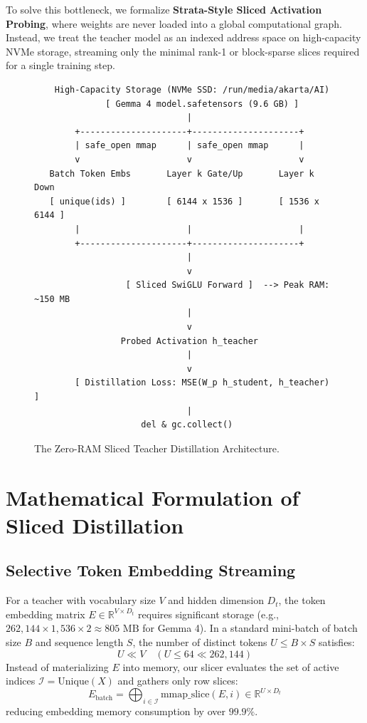 \documentclass[11pt,a4paper]{article}
\begin{document}
To solve this bottleneck, we formalize \textbf{Strata-Style Sliced Activation Probing}, where weights are never loaded into a global computational graph. Instead, we treat the teacher model as an indexed address space on high-capacity NVMe storage, streaming only the minimal rank-1 or block-sparse slices required for a single training step.

\begin{figure}[h]
\centering
\begin{verbatim}
    High-Capacity Storage (NVMe SSD: /run/media/akarta/AI)
              [ Gemma 4 model.safetensors (9.6 GB) ]
                              |
        +---------------------+---------------------+
        | safe_open mmap      | safe_open mmap      |
        v                     v                     v
   Batch Token Embs       Layer k Gate/Up       Layer k Down
   [ unique(ids) ]        [ 6144 x 1536 ]       [ 1536 x 6144 ]
        |                     |                     |
        +---------------------+---------------------+
                              |
                              v
                  [ Sliced SwiGLU Forward ]  --> Peak RAM: ~150 MB
                              |
                              v
                 Probed Activation h_teacher
                              |
                              v
        [ Distillation Loss: MSE(W_p h_student, h_teacher) ]
                              |
                     del & gc.collect()
\end{verbatim}
\caption{The Zero-RAM Sliced Teacher Distillation Architecture.}
\label{fig:zero_ram_arch}
\end{figure}

\section{Mathematical Formulation of Sliced Distillation}

\subsection{Selective Token Embedding Streaming}
For a teacher with vocabulary size $V$ and hidden dimension $D_t$, the token embedding matrix $E \in \mathbb{R}^{V \times D_t}$ requires significant storage (e.g., $262,144 \times 1,536 \times 2 \approx 805\text{ MB}$ for Gemma 4). In a standard mini-batch of batch size $B$ and sequence length $S$, the number of distinct tokens $U \le B \times S$ satisfies:
\begin{equation}
U \ll V \quad (U \le 64 \ll 262,144)
\end{equation}
Instead of materializing $E$ into memory, our slicer evaluates the set of active indices $\mathcal{I} = \text{Unique}(X)$ and gathers only row slices:
\begin{equation}
E_{\text{batch}} = \bigoplus_{i \in \mathcal{I}} \text{mmap\_slice}(E, i) \in \mathbb{R}^{U \times D_t}
\end{equation}
reducing embedding memory consumption by over $99.9\%$.
\end{document}
